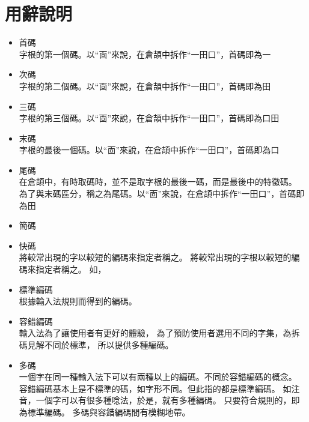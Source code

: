 \documentclass{article}
\begin{document}
\section{用辭說明}
\begin{itemize}
\item 首碼\\
字根的第一個碼。以``靣''來說，在倉頡中拆作``一田口''，首碼即為一\\
\item 次碼\\
字根的第二個碼。以``靣''來說，在倉頡中拆作``一田口''，首碼即為田\\
\item 三碼\\
字根的第三個碼。以``靣''來說，在倉頡中拆作``一田口''，首碼即為口田\\
\item 末碼\\
字根的最後一個碼。以``靣''來說，在倉頡中拆作``一田口''，首碼即為口\\
\item 尾碼\\
在倉頡中，有時取碼時，並不是取字根的最後一碼，而是最後中的特徵碼。\\
為了與末碼區分，稱之為尾碼。以``靣''來說，在倉頡中拆作``一田口''，首碼即為田
 
\item 簡碼\\
\item 快碼\\
將較常出現的字以較短的編碼來指定者稱之。
將較常出現的字根以較短的編碼來指定者稱之。
如，

\item 標準編碼\\
根據輸入法規則而得到的編碼。

\item 容錯編碼\\
輸入法為了讓使用者有更好的體驗，
為了預防使用者選用不同的字集，為拆碼見解不同於標準，
所以提供多種編碼。

\item 多碼\\
一個字在同一種輸入法下可以有兩種以上的編碼。不同於容錯編碼的概念。\\
      容錯編碼基本上是不標準的碼，如字形不同。但此指的都是標準編碼。
      如注音，一個字可以有很多種唸法，於是，就有多種編碼。
      只要符合規則的，即為標準編碼。
      多碼與容錯編碼間有模糊地帶。

%
\end{itemize}
\end{document}
